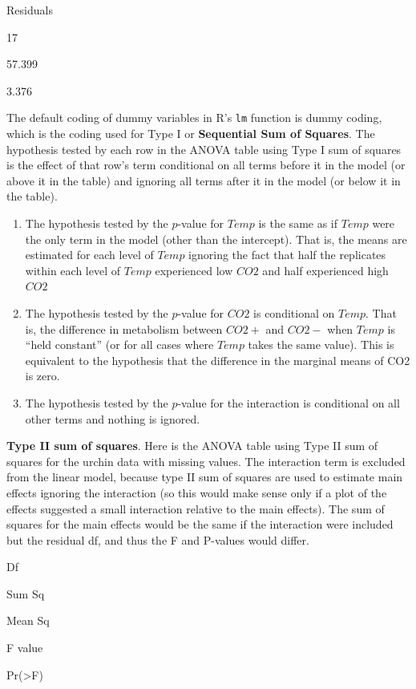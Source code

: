 \documentclass[]{book}
\begin{document}
Residuals

17

57.399

3.376

The default coding of dummy variables in R's \texttt{lm} function is dummy coding, which is the coding used for Type I or \textbf{Sequential Sum of Squares}. The hypothesis tested by each row in the ANOVA table using Type I sum of squares is the effect of that row's term conditional on all terms before it in the model (or above it in the table) and ignoring all terms after it in the model (or below it in the table).

\begin{enumerate}
\def\labelenumi{\arabic{enumi}.}
\item
  The hypothesis tested by the \(p\)-value for \(Temp\) is the same as if \(Temp\) were the only term in the model (other than the intercept). That is, the means are estimated for each level of \(Temp\) ignoring the fact that half the replicates within each level of \(Temp\) experienced low \(CO2\) and half experienced high \(CO2\)
\item
  The hypothesis tested by the \(p\)-value for \(CO2\) is conditional on \(Temp\). That is, the difference in metabolism between \(CO2+\) and \(CO2-\) when \(Temp\) is ``held constant'' (or for all cases where \(Temp\) takes the same value). This is equivalent to the hypothesis that the difference in the marginal means of CO2 is zero.
\item
  The hypothesis tested by the \(p\)-value for the interaction is conditional on all other terms and nothing is ignored.
\end{enumerate}

\textbf{Type II sum of squares}. Here is the ANOVA table using Type II sum of squares for the urchin data with missing values. The interaction term is excluded from the linear model, because type II sum of squares are used to estimate main effects ignoring the interaction (so this would make sense only if a plot of the effects suggested a small interaction relative to the main effects). The sum of squares for the main effects would be the same if the interaction were included but the residual df, and thus the F and P-values would differ.

Df

Sum Sq

Mean Sq

F value

Pr(\textgreater F)
\end{document}
